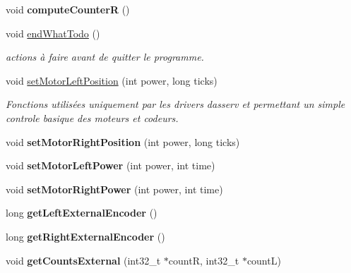 \begin{DoxyCompactItemize}
void {\bfseries compute\+CounterR} ()
\item 
\mbox{\label{classAsservDriver_a636bf5413d2cf0419f188a4965340758}} 
void \hyperlink{classAsservDriver_a636bf5413d2cf0419f188a4965340758}{end\+What\+Todo} ()
\begin{DoxyCompactList}\small\item\em actions à faire avant de quitter le programme. \end{DoxyCompactList}\item 
\mbox{\label{classAsservDriver_a49dad05da23fe62aa4bf582199eaa3a6}} 
void \hyperlink{classAsservDriver_a49dad05da23fe62aa4bf582199eaa3a6}{set\+Motor\+Left\+Position} (int power, long ticks)
\begin{DoxyCompactList}\small\item\em Fonctions utilisées uniquement par les drivers d\textquotesingle{}asserv et permettant un simple controle basique des moteurs et codeurs. \end{DoxyCompactList}\item 
\mbox{\label{classAsservDriver_a62a57e92e4933413d9c3c6b62f496ef3}} 
void {\bfseries set\+Motor\+Right\+Position} (int power, long ticks)
\item 
\mbox{\label{classAsservDriver_a3b702233fa09a657bb03372470152376}} 
void {\bfseries set\+Motor\+Left\+Power} (int power, int time)
\item 
\mbox{\label{classAsservDriver_a54e742670bae9a19dc70b982cad4c3ba}} 
void {\bfseries set\+Motor\+Right\+Power} (int power, int time)
\item 
\mbox{\label{classAsservDriver_aa6924c9da7428d59fa712c15221dfbac}} 
long {\bfseries get\+Left\+External\+Encoder} ()
\item 
\mbox{\label{classAsservDriver_afda042c513d96188f8572899679cc616}} 
long {\bfseries get\+Right\+External\+Encoder} ()
\item 
\mbox{\label{classAsservDriver_a40d638a52c2ef3c2e98fe4ffa9a7bfe9}} 
void {\bfseries get\+Counts\+External} (int32\+\_\+t $\ast$countR, int32\+\_\+t $\ast$countL)

\end{DoxyCompactItemize}
